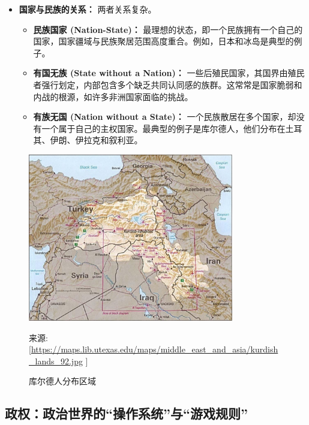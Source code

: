 \documentclass[a5paper, 11pt, openany]{ctexbook}
\begin{document}
\begin{itemize}
    \item \textbf{国家与民族的关系：} 两者关系复杂。
    \begin{itemize}
        \item \textbf{民族国家 (Nation-State)：} 最理想的状态，即一个民族拥有一个自己的国家，国家疆域与民族聚居范围高度重合。例如，日本和冰岛是典型的例子。
        \item \textbf{有国无族 (State without a Nation)：} 一些后殖民国家，其国界由殖民者强行划定，内部包含多个缺乏共同认同感的族群。这常常是国家脆弱和内战的根源，如许多非洲国家面临的挑战。
        \item \textbf{有族无国 (Nation without a State)：} 一个民族散居在多个国家，却没有一个属于自己的主权国家。最典型的例子是库尔德人，他们分布在土耳其、伊朗、伊拉克和叙利亚。
    \end{itemize}
\end{itemize}

\begin{figure}[htbp]
\centering
    \includegraphics[width=0.8\textwidth]{kurdish.jpeg}
    \caption{库尔德人分布区域} %
    \small %
    \par\vspace{-0.5em} %
    来源: [\url{https://maps.lib.utexas.edu/maps/middle_east_and_asia/kurdish_lands_92.jpg} ]%
    \label{fig:kurdish}
\end{figure}

\subsection{政权：政治世界的“操作系统”与“游戏规则”}
\end{document}
